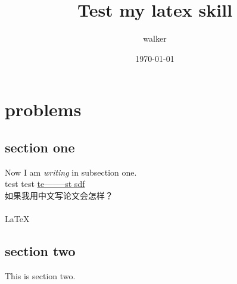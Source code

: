 \documentclass{report}
\begin{document}
\title{Test my latex skill}
\author{walker}
\date{\today}
\maketitle



\chapter{problems}
	\section{section one}
	Now I am \emph{writing} in subsection one.\\
	test test \underline{te--------st sdf}\\
	如果我用中文写论文会怎样？\\
	\XeTeX \\
	\LaTeX
	
	\section{section two}
	This is section two.
\end{document}
